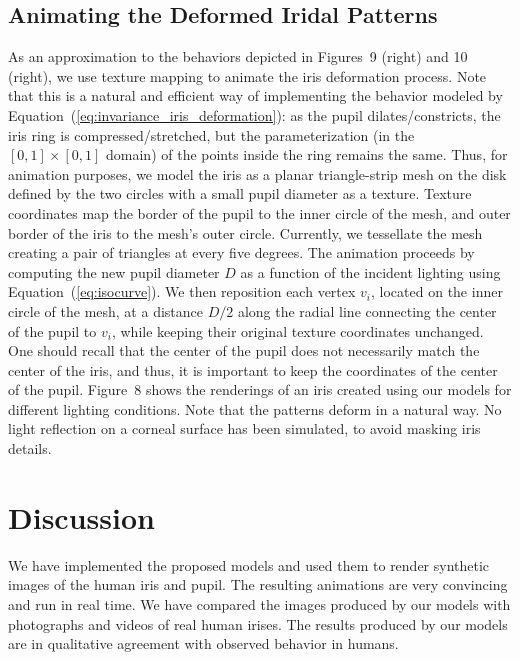\documentclass{acmtog}
\begin{document}
%
\subsection{Animating the Deformed Iridal Patterns}
\label{sec:iris_animation}
%
As an approximation to the behaviors depicted in Figures~9 (right) and
10 (right), we use texture mapping to animate the iris deformation process. Note that this
is a natural and efficient way of implementing the behavior modeled by Equation~(\ref{eq:invariance_iris_deformation}): as
the pupil dilates/constricts, the iris ring is compressed/stretched, but the parameterization (in the $[0,1] \times [0,1]$
domain) of the points inside the ring remains the same. Thus, for animation purposes, we model the iris as a planar
triangle-strip mesh on the disk defined by the two circles %
with a small pupil diameter as a texture. Texture coordinates map the border of the pupil to the inner circle of the mesh,
and outer border of the iris to the mesh's outer circle. Currently, we tessellate the mesh creating a pair of triangles at
every five degrees. The animation proceeds by computing the new pupil diameter $D$ as a function of the incident lighting
using Equation~(\ref{eq:isocurve}). We then reposition each vertex $v_i$, located on the inner circle of the mesh, at a
distance $D/2$ along the radial line connecting the center of the pupil to $v_i$, while keeping their original texture
coordinates unchanged. One should recall that the center of the pupil does not necessarily match the center of the iris,
and thus, it is important to keep the coordinates of the center of the pupil. Figure~8 shows the
renderings of an iris created using our models for different lighting conditions. Note that the patterns deform in a 
natural way. No light reflection on a corneal surface has been simulated, to avoid masking iris details.


\section{Discussion}
\label{sec:results}

We have implemented the proposed models and used them to render synthetic images of the human iris and pupil. 
The resulting animations are very convincing and run in real time. 
We have compared  the images produced by our models with photographs and videos of real human irises.  
The results produced by our models are in qualitative agreement with observed behavior in humans. 
 
\end{document}
